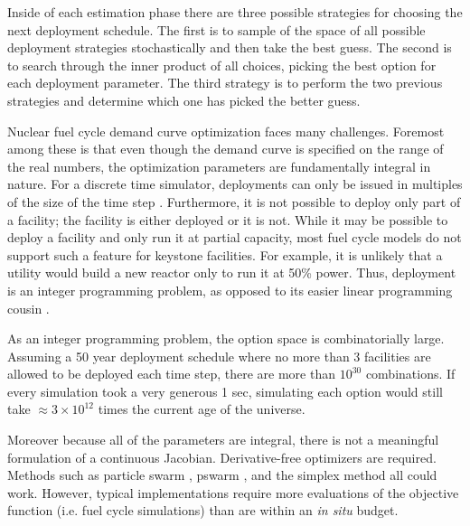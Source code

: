 Inside of each estimation phase there are three possible strategies for 
choosing the next deployment schedule.  The first is to sample of the 
space of all possible deployment strategies stochastically and then take the 
best guess.  The second is to search through the inner product of all choices,
picking the best option for each deployment parameter. The third strategy
is to perform the two previous strategies and determine which one has picked
the better guess.

Nuclear fuel cycle demand curve optimization faces many challenges. 
Foremost among these is that even though the demand curve is specified on 
the range of the real numbers, the optimization parameters are fundamentally 
integral in nature. For a discrete time simulator, deployments can only 
be issued in multiples of the size of the time step 
\cite{kelton2000simulation}. Furthermore, 
it is not possible to deploy only part of a facility; the facility is either 
deployed or it is not. While it may be possible to deploy a facility and 
only run it at partial capacity, most fuel cycle models do not support such
a feature for
keystone facilities.  For example, it is unlikely that a utility would build 
a new reactor only to run it at 50\% power. Thus, deployment is an integer 
programming problem, as opposed to its easier linear programming cousin
\cite{vanderbei2001linear}.

As an integer programming problem, the option space is combinatorially 
large. Assuming a 50 year deployment schedule where no more than 3 facilities 
are allowed to be deployed each time step, there are more than $10^{30}$ 
combinations. If every simulation took a very generous 1 sec, simulating 
each option would still take $\approx 3\times10^{12}$ times the current age
of the universe.

Moreover because all of the parameters are integral, there is not a 
meaningful formulation of a continuous Jacobian. Derivative-free optimizers are 
required. Methods such as particle swarm \cite{kennedy2010particle}, 
pswarm \cite{vaz2009pswarm}, and the 
simplex method \cite{vanderbei2001linear} all could work.  However, typical 
implementations require
more evaluations of the objective function (i.e. fuel cycle simulations)
than are within an \emph{in situ} budget. 

